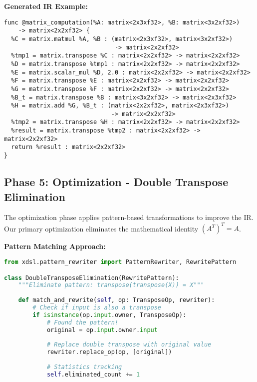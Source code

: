\documentclass[11pt,a4paper]{article}
\begin{document}
\textbf{Generated IR Example:}
\begin{lstlisting}[language=MLIR, caption=Matrix dialect IR before optimization]
func @matrix_computation(%A: matrix<2x3xf32>, %B: matrix<3x2xf32>) 
    -> matrix<2x2xf32> {
  %C = matrix.matmul %A, %B : (matrix<2x3xf32>, matrix<3x2xf32>) 
                               -> matrix<2x2xf32>
  %tmp1 = matrix.transpose %C : matrix<2x2xf32> -> matrix<2x2xf32>
  %D = matrix.transpose %tmp1 : matrix<2x2xf32> -> matrix<2x2xf32>
  %E = matrix.scalar_mul %D, 2.0 : matrix<2x2xf32> -> matrix<2x2xf32>
  %F = matrix.transpose %E : matrix<2x2xf32> -> matrix<2x2xf32>
  %G = matrix.transpose %F : matrix<2x2xf32> -> matrix<2x2xf32>
  %B_t = matrix.transpose %B : matrix<3x2xf32> -> matrix<2x3xf32>
  %H = matrix.add %G, %B_t : (matrix<2x2xf32>, matrix<2x3xf32>) 
                              -> matrix<2x2xf32>
  %tmp2 = matrix.transpose %H : matrix<2x2xf32> -> matrix<2x2xf32>
  %result = matrix.transpose %tmp2 : matrix<2x2xf32> -> matrix<2x2xf32>
  return %result : matrix<2x2xf32>
}
\end{lstlisting}

\subsection{Phase 5: Optimization - Double Transpose Elimination}

The optimization phase applies pattern-based transformations to improve the IR. Our primary optimization eliminates the mathematical identity $(A^T)^T = A$.

\textbf{Pattern Matching Approach:}
\begin{lstlisting}[language=Python, caption=Pattern-based optimization using xDSL's rewriter]
from xdsl.pattern_rewriter import PatternRewriter, RewritePattern

class DoubleTransposeElimination(RewritePattern):
    """Eliminate pattern: transpose(transpose(X)) = X"""
    
    def match_and_rewrite(self, op: TransposeOp, rewriter):
        # Check if input is also a transpose
        if isinstance(op.input.owner, TransposeOp):
            # Found the pattern!
            original = op.input.owner.input
            
            # Replace double transpose with original value
            rewriter.replace_op(op, [original])
            
            # Statistics tracking
            self.eliminated_count += 1
\end{lstlisting}
\end{document}
